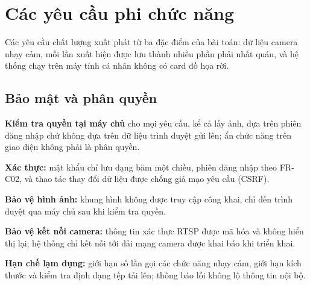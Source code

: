 \section{Các yêu cầu phi chức năng}
\label{sec:4.3}

Các yêu cầu chất lượng xuất phát từ ba đặc điểm của bài toán: dữ liệu camera nhạy cảm, mỗi lần xuất hiện được lưu thành nhiều phần phải nhất quán, và hệ thống chạy trên máy tính cá nhân không có card đồ họa rời.

\subsection{Bảo mật và phân quyền}
\label{sec:4.3.1}

\begin{reqlist}
    \item[NFR-01] \textbf{Kiểm tra quyền tại máy chủ} cho mọi yêu cầu, kể cả lấy ảnh, dựa trên phiên đăng nhập chứ không dựa trên dữ liệu trình duyệt gửi lên; ẩn chức năng trên giao diện không phải là phân quyền.
    \item[NFR-02] \textbf{Xác thực:} mật khẩu chỉ lưu dạng băm một chiều, phiên đăng nhập theo FR-C02, và thao tác thay đổi dữ liệu được chống giả mạo yêu cầu (CSRF).
    \item[NFR-03] \textbf{Bảo vệ hình ảnh:} khung hình không được truy cập công khai, chỉ đến trình duyệt qua máy chủ sau khi kiểm tra quyền.
    \item[NFR-04] \textbf{Bảo vệ kết nối camera:} thông tin xác thực RTSP được mã hóa và không hiển thị lại; hệ thống chỉ kết nối tới dải mạng camera được khai báo khi triển khai.
    \item[NFR-05] \textbf{Hạn chế lạm dụng:} giới hạn số lần gọi các chức năng nhạy cảm, giới hạn kích thước và kiểm tra định dạng tệp tải lên; thông báo lỗi không lộ thông tin nội bộ.
\end{reqlist}

